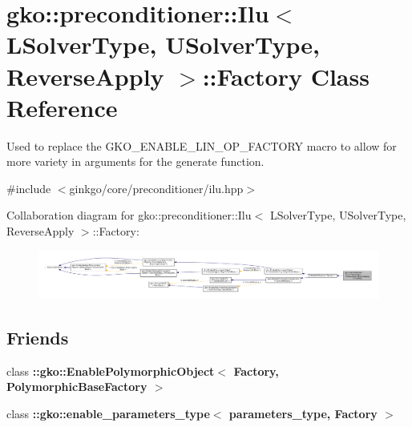 \hypertarget{classgko_1_1preconditioner_1_1Ilu_1_1Factory}{}\section{gko\+:\+:preconditioner\+:\+:Ilu$<$ L\+Solver\+Type, U\+Solver\+Type, Reverse\+Apply $>$\+:\+:Factory Class Reference}
\label{classgko_1_1preconditioner_1_1Ilu_1_1Factory}


Used to replace the {\ttfamily G\+K\+O\+\_\+\+E\+N\+A\+B\+L\+E\+\_\+\+L\+I\+N\+\_\+\+O\+P\+\_\+\+F\+A\+C\+T\+O\+RY} macro to allow for more variety in arguments for the {\ttfamily generate} function.  




{\ttfamily \#include $<$ginkgo/core/preconditioner/ilu.\+hpp$>$}



Collaboration diagram for gko\+:\+:preconditioner\+:\+:Ilu$<$ L\+Solver\+Type, U\+Solver\+Type, Reverse\+Apply $>$\+:\+:Factory\+:
\nopagebreak
\begin{figure}[H]
\begin{center}
\leavevmode
\includegraphics[width=350pt]{classgko_1_1preconditioner_1_1Ilu_1_1Factory__coll__graph}
\end{center}
\end{figure}
\subsection*{Friends}
\begin{DoxyCompactItemize}
\item 
\mbox{\label{classgko_1_1preconditioner_1_1Ilu_1_1Factory_a2a6b35c88496f3709ef169c0fc4b7cb5}} 
class {\bfseries \+::gko\+::\+Enable\+Polymorphic\+Object$<$ Factory, Polymorphic\+Base\+Factory $>$}
\item 
\mbox{\label{classgko_1_1preconditioner_1_1Ilu_1_1Factory_a0d176cbd42d6214e11aee8c30ca256fc}} 
class {\bfseries \+::gko\+::enable\+\_\+parameters\+\_\+type$<$ parameters\+\_\+type, Factory $>$}
\end{DoxyCompactItemize}
